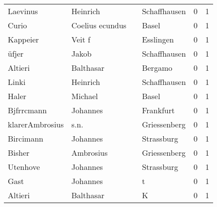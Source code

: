 \documentclass[10pt,a4paper,landscape]{article}
\begin{document}
\begin{longtable}{llllrr}
                 Laevinus &                           Heinrich &             &                                Schaffhausen &          0 &         1 \\
                    Curio &                    Coelius ecundus &             &                                       Basel &          0 &         1 \\
                 Kappeier &                             Veit f &             &                                   Esslingen &          0 &         1 \\
                    üfjer &                              Jakob &             &                                Schaffhausen &          0 &         1 \\
                  Altieri &                          Balthasar &             &                                     Bergamo &          0 &         1 \\
                    Linki &                           Heinrich &             &                                Schaffhausen &          0 &         1 \\
                    Haler &                            Michael &             &                                       Basel &          0 &         1 \\
               Bjfrrcmann &                           Johannes &             &                                   Frankfurt &          0 &         1 \\
          klarerAmbrosius &                               s.n. &             &                                Griessenberg &          0 &         1 \\
                Bircimann &                           Johannes &             &                                  Strassburg &          0 &         1 \\
                   Bisher &                          Ambrosius &             &                                Griessenberg &          0 &         1 \\
                 Utenhove &                           Johannes &             &                                  Strassburg &          0 &         1 \\
                     Gast &                           Johannes &             &                                           t &          0 &         1 \\
                  Altieri &                          Balthasar &             &                                           K &          0 &         1 \\

\end{longtable}
\end{document}
